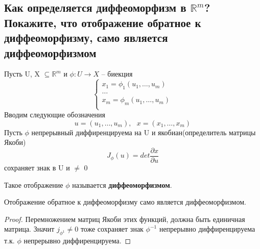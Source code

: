 
\subsection{Как определяется диффеоморфизм в $\mathbb{R}^m$? Покажите, что отображение обратное к диффеоморфизму, само является диффеоморфизмом}
\begin{definition*}
    Пусть U, X $\subseteq\mathbb{R}^m$ и $\phi:U \rightarrow X$ -- биекция
    \[
        \begin{cases}
            x_1 = \phi_1(u_1, \ldots, u_m) \\
            \ldots \\
            x_m = \phi_m(u_1, \ldots, u_m) \\
        \end{cases}
    \]
    Вводим следующие обозначения
    \[u = (u_1, \ldots, u_m),\text{ }x = (x_1, \ldots, x_m)\]
    Пусть $\phi$ непрерывный диффиренцируема на U и якобиан(определитель матрицы Якоби)
    \[J_\phi(u) = det\frac{\partial x}{\partial u}\]
    сохраняет знак в U и $\neq$ 0
    
    Такое отображение $\phi$ называется \textbf{диффеоморфизмом}.
\end{definition*}
\begin{theorem}
    Отображение обратное к диффеоморфизму само является диффеоморфизмом.
\end{theorem}
\begin{proof}
    Перемножением матриц Якоби этих функций, должна быть единичная матрица. Значит $j_{\phi^1}\neq 0$ тоже сохраняет знак
    $\phi^{-1}$ непрерывно диффиренцируема т.к. $\phi$ непрерывно диффиренцируема.
\end{proof}

